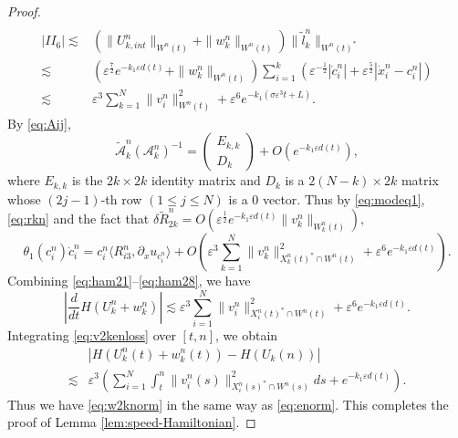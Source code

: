 \documentclass[11pt]{amsart}
\theoremstyle{remark}
\numberwithin{equation}{section}
\begin{document}
\begin{proof}
\begin{equation}
\begin{split}
  \end{split}
\end{equation}
\begin{equation}
  \label{eq:ham27}
  \begin{split}
|II_6|\lesssim & (\|U_{k,int}^n\|_{W^n(t)}+\|w_k^n\|_{W^n(t)})
\|\tilde{l}_k^n\|_{W^n(t)^*}
\\ \lesssim & 
({\varepsilon}^{\frac72}e^{-k_1{\varepsilon} d(t)}+\|w_k^n\|_{W^n(t)})
\sum_{i=1}^k ({\varepsilon}^{-\frac12}|\dot{c}_i^n|+{\varepsilon}^{\frac52}|\dot{x}_i^n-c_i^n|)
\\ \lesssim & {\varepsilon}^3\sum_{k=1}^N\|v_i^n\|_{W^n(t)}^2+{\varepsilon}^6e^{-k_1(\sigma{\varepsilon}^3t+L)}.    
  \end{split}
\end{equation}
By \eqref{eq:Aij},
$$\widetilde{\mathcal{A}}_k^n(\mathcal{A}_k^n)^{-1}=
\begin{pmatrix}E_{k,k}\\ D_k\end{pmatrix}+O(e^{-k_1{\varepsilon} d(t)}),$$
where $E_{k,k}$ is the $2k\times 2k$ identity matrix and 
$D_k$ is a $2(N-k)\times 2k$ matrix whose  $(2j-1)$-th row $(1\le j\le N)$
is a $0$ vector.
Thus by \eqref{eq:modeq1},  \eqref{eq:rkn} and the fact that
$\delta{\widetilde{R}}_{2k}^n=O({\varepsilon}^{\frac12}e^{-k_1{\varepsilon} d(t)}\|v_k^n\|_{W_k^n(t)}),$
\begin{equation}
  \label{eq:ham28}
\theta_1(c_i^n)\dot{c}_i^n= c_i^n{\langle} R_{i3}^n,{\partial}_xu_{c_i^n}{\rangle}
+O\left({\varepsilon}^3\sum_{k=1}^N\|v_k^n\|_{X_k^n(t)^*\cap W^n(t)}^2
+{\varepsilon}^6e^{-k_1{\varepsilon} d(t)}\right).
\end{equation}
Combining \eqref{eq:ham21}--\eqref{eq:ham28}, we have
\begin{equation}
  \label{eq:v2kenloss}
\left|\frac{d}{dt}H(U_k^n+w_k^n)\right|
\lesssim  {\varepsilon}^3\sum_{i=1}^N\|v_i^n\|_{X_i^n(t)^*\cap W^n(t)}^2+{\varepsilon}^6e^{-k_1{\varepsilon} d(t)}.
\end{equation}
Integrating \eqref{eq:v2kenloss} over $[t,n]$, we obtain
\begin{equation*}
  \begin{split}
& \left|H(U_k^n(t)+w_k^n(t))-H(U_k(n))\right|
 \\ \lesssim & {\varepsilon}^3\left(\sum_{i=1}^N \int_t^n \|v_i^n(s)\|_{X_i^n(s)^*\cap W^n(s)}^2ds
+e^{-k_1{\varepsilon} d(t)}\right).
  \end{split}
\end{equation*}
Thus we have \eqref{eq:w2knorm} in the same way as \eqref{eq:enorm}.
This completes the proof of Lemma \ref{lem:speed-Hamiltonian}.
\end{proof}
\end{document}
